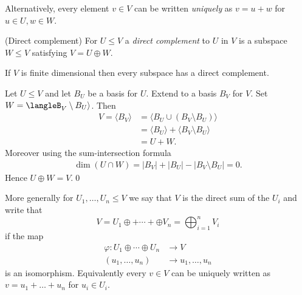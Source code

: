 \documentclass{article}
\begin{document}
Alternatively, every element $ v\in V $ can be written \textit{uniquely} as $ v=u+w $ for $ u\in U, w\in W $.
\begin{definition}
	(Direct complement) For $ U\le V $ a \textit{direct complement} to $ U $ in $ V $ is a subspace $ W\le V $ satisfying $ V=U\oplus W $.
\end{definition}
\begin{proposition}
  If $ V $ is finite dimensional then every subspace has a direct complement.
\end{proposition}
\pf Let $ U\le V $ and let $ B_U $ be a basis for $ U $. Extend to a basis $ B_V $ for $ V $. Set $ W=\langleB_V\setminus B_U\rangle $. Then
\begin{align*}
	V=\langle B_V\rangle &= \langle B_U\cup (B_V\setminus B_U)\rangle\\
			     &= \langle B_U\rangle + \langle B_V\setminus B_U\rangle \\
			     &=U+W.
\end{align*}
Moreover using the sum-intersection formula
\begin{align*}
	\dim (U\cap W)=|B_V|+|B_U|-|B_V\setminus B_U|=0.
\end{align*}
Hence $ U\oplus W=V $.\qed\par
More generally for $ U_1,\dots, U_n\le V $ we say that $ V $ is the direct sum of the $ U_i $ and write that
\[
	V=U_1\oplus+\cdots +\oplus V_n=\bigoplus_{i=1}^n V_i
\]
if the map
\begin{align*}
	\varphi: U_1\oplus\cdots\oplus U_n &\to V\\
	(u_1,\dots, u_n) &\to u_1,\dots, u_n
\end{align*}
is an isomorphism. Equivalently every $ v\in V $ can be uniquely written as $ v=u_1+\dots +u_n $ for $ u_i\in U_i $.
\end{document}

